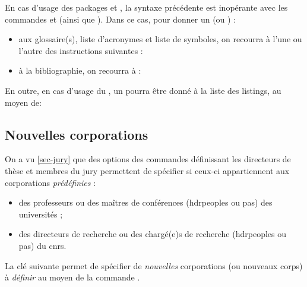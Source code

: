 En cas d'usage des packages  et , la
syntaxe précédente est inopérante avec les commandes
 et  (ainsi que
). Dans ce cas, pour donner un  (ou
)  :
\begin{itemize}
\item%
  aux glossaire(s), liste d'acronymes et liste de symboles, on recourra
  à l'une ou l'autre des instructions suivantes :
\begin{bodycode}[listing options={deletekeywords={title}}]
\printglossary[title="\meta{titre alternatif}"]
\printglossaries[title="\meta{titre alternatif}"]
\printacronyms[title="\meta{titre alternatif}"]
\printsymbols[title="\meta{titre alternatif}"]
\end{bodycode}
\item%
  à la bibliographie, on recourra à :
\begin{bodycode}[listing options={deletekeywords={title}}]
\printbibliography[title="\meta{titre alternatif}"]
\end{bodycode}
\end{itemize}

En outre, en cas d'usage du , un 
pourra être donné à la liste des listings, au moyen de:
\begin{preamblecode}[title=Par exemple dans le \File{\configurationfile}]
\renewcommand\lstlistingname{"\meta{titre alternatif}"}
\end{preamblecode}

\subsection{Nouvelles corporations}\label{sec-nouveaux-corps}
%
%

On a vu \vref{sec-jury} que des options des commandes définissant les
directeurs de thèse et membres du jury permettent de spécifier si ceux-ci
appartiennent aux corporations \emph{prédéfinies} :
\begin{itemize}
\item des professeurs ou des maîtres de conférences (\glspl{hdrpeople} ou pas) des
  universités ;
\item des directeurs de recherche ou des chargé(e)s de recherche (\glspl{hdrpeople} ou
  pas) du \gls{cnrs}.
\end{itemize}
La clé  suivante permet de spécifier de \emph{nouvelles}
corporations (ou nouveaux corps) à \emph{définir} au moyen de la commande
.

